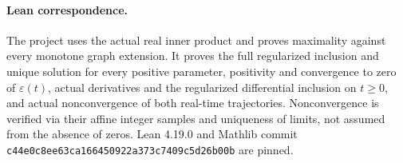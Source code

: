 \documentclass[11pt]{article}
\begin{document}
\paragraph{Lean correspondence.}
The project uses the actual real inner product and proves maximality
against every monotone graph extension. It proves the full regularized
inclusion and unique solution for every positive parameter, positivity
and convergence to zero of $\varepsilon(t)$, actual derivatives and the
regularized differential inclusion on $t\ge0$, and actual nonconvergence
of both real-time trajectories. Nonconvergence is verified via their
affine integer samples and uniqueness of limits, not assumed from the
absence of zeros. Lean 4.19.0 and Mathlib commit
\texttt{c44e0c8ee63ca166450922a373c7409c5d26b00b} are pinned.
\end{document}
